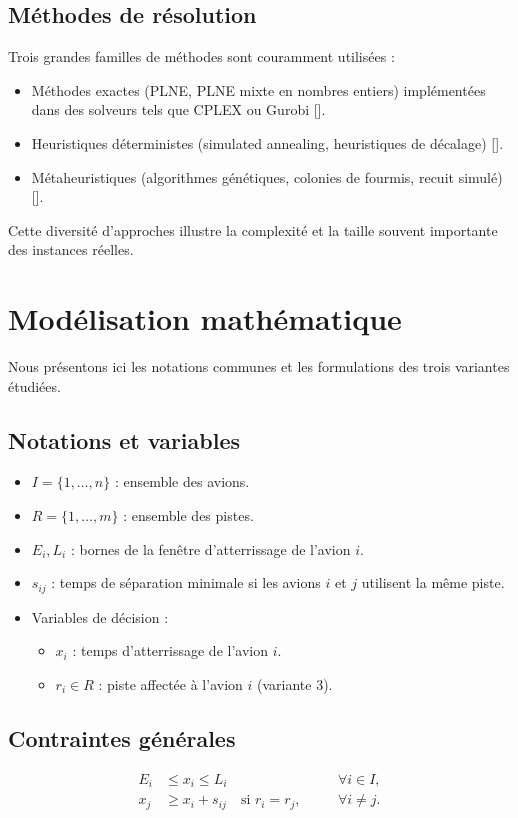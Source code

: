 \documentclass[a4paper,12pt]{report}
\begin{document}
\subsection{Méthodes de résolution}
Trois grandes familles de méthodes sont couramment utilisées :
\begin{itemize}
  \item Méthodes exactes (PLNE, PLNE mixte en nombres entiers) implémentées dans des solveurs tels que CPLEX ou Gurobi [\citep{andersen2000anova, bottonato2014aircraft}].
  \item Heuristiques déterministes (simulated annealing, heuristiques de décalage) [\citep{beasley1998heuristic}].
  \item Métaheuristiques (algorithmes génétiques, colonies de fourmis, recuit simulé) [\citep{rachid2013metaheuristic}].
\end{itemize}
Cette diversité d'approches illustre la complexité et la taille souvent importante des instances réelles.

\section{Modélisation mathématique}
Nous présentons ici les notations communes et les formulations des trois variantes étudiées.

\subsection{Notations et variables}
\begin{itemize}
  \item $I=\{1,\dots,n\}$ : ensemble des avions.
  \item $R=\{1,\dots,m\}$ : ensemble des pistes.
  \item $E_i, L_i$ : bornes de la fenêtre d'atterrissage de l'avion $i$.
  \item $s_{ij}$ : temps de séparation minimale si les avions $i$ et $j$ utilisent la même piste.
  \item Variables de décision :
    \begin{itemize}
      \item $x_i$ : temps d'atterrissage de l'avion $i$.
      \item $r_i\in R$ : piste affectée à l'avion $i$ (variante 3).
    \end{itemize}
\end{itemize}

\subsection{Contraintes générales}
\begin{align}
  E_i &\le x_i \le L_i &&\forall i\in I, \\
  x_j &\ge x_i + s_{ij} \quad\text{si } r_i = r_j,\quad &&\forall i\neq j.
\end{align}
\end{document}
